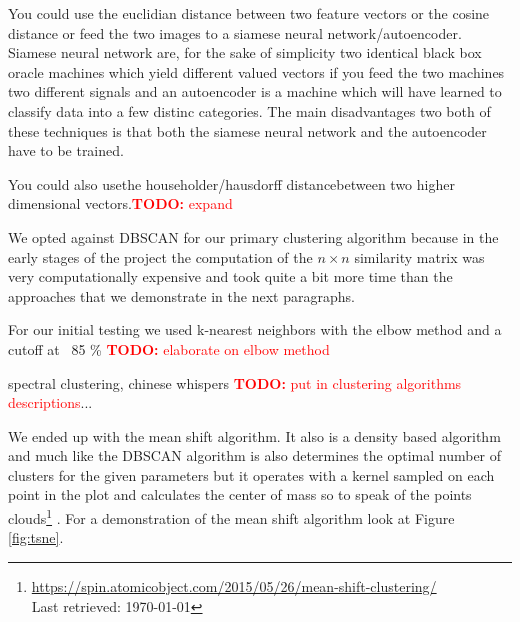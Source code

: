 \documentclass[journal]{vgtc}       %
\newcommand{\todo}[1]{\textcolor{red}{\textbf{TODO:} #1}}
\begin{document}
You could use the euclidian distance between two feature vectors or the cosine distance or feed the two images to a siamese neural network/autoencoder. Siamese neural network are, for the sake of simplicity two identical black box oracle machines which yield different valued vectors if you feed the two machines two different signals and  an autoencoder is a machine which will have learned to classify data into a few distinc categories. The main disadvantages two both of these techniques is that both the siamese neural network and the autoencoder have to be trained.

You could also usethe householder/hausdorff distancebetween two higher dimensional vectors.\todo{expand}

We opted against DBSCAN for our primary clustering algorithm because in the early stages of the project the computation of the \(n\times n\) similarity matrix was very computationally expensive and took quite a bit more time than the approaches that we demonstrate in the next paragraphs.


For our initial testing we used k-nearest neighbors with the elbow method and a cutoff at  ~85 \% \todo{elaborate on elbow method}

spectral clustering, chinese whispers  \todo{put in clustering algorithms descriptions}... 

We ended up with the mean shift algorithm. It also is a density based algorithm and much like the DBSCAN algorithm is also determines the optimal number of clusters for the given parameters but it operates with a kernel sampled on each point in the plot and calculates the center of mass so to speak of the points clouds\footnote{\url{https://spin.atomicobject.com/2015/05/26/mean-shift-clustering/}\\ Last retrieved: \today} . For a demonstration of the mean shift algorithm look at Figure \ref{fig:tsne}. 
\end{document}
